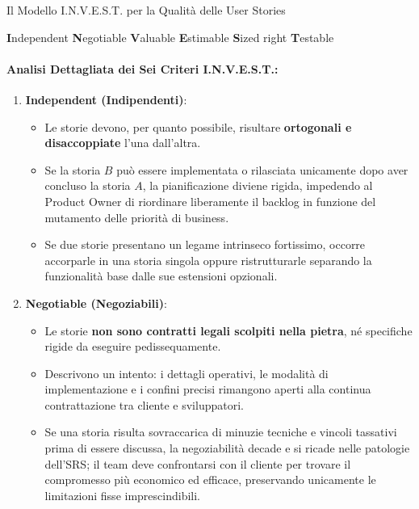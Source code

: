 \documentclass[12pt]{extarticle}
\begin{document}
\begin{cbox}{Il Modello I.N.V.E.S.T. per la Qualità delle User Stories}
\begin{center}
\large
\textbf{I}ndependent \quad \textbf{N}egotiable \quad \textbf{V}aluable \quad \textbf{E}stimable \quad \textbf{S}ized right \quad \textbf{T}estable
\end{center}
\end{cbox}

\paragraph{Analisi Dettagliata dei Sei Criteri I.N.V.E.S.T.:}

\begin{enumerate}
    \item \textbf{Independent (Indipendenti)}:
    \begin{itemize}
        \item Le storie devono, per quanto possibile, risultare \textbf{ortogonali e disaccoppiate} l'una dall'altra.
        \item Se la storia $B$ può essere implementata o rilasciata unicamente dopo aver concluso la storia $A$, la pianificazione diviene rigida, impedendo al Product Owner di riordinare liberamente il backlog in funzione del mutamento delle priorità di business.
        \item Se due storie presentano un legame intrinseco fortissimo, occorre accorparle in una storia singola oppure ristrutturarle separando la funzionalità base dalle sue estensioni opzionali.
    \end{itemize}

    \item \textbf{Negotiable (Negoziabili)}:
    \begin{itemize}
        \item Le storie \textbf{non sono contratti legali scolpiti nella pietra}, né specifiche rigide da eseguire pedissequamente.
        \item Descrivono un intento: i dettagli operativi, le modalità di implementazione e i confini precisi rimangono aperti alla continua contrattazione tra cliente e sviluppatori.
        \item Se una storia risulta sovraccarica di minuzie tecniche e vincoli tassativi prima di essere discussa, la negoziabilità decade e si ricade nelle patologie dell'SRS; il team deve confrontarsi con il cliente per trovare il compromesso più economico ed efficace, preservando unicamente le limitazioni fisse imprescindibili.
    \end{itemize}


\end{enumerate}
\end{document}

